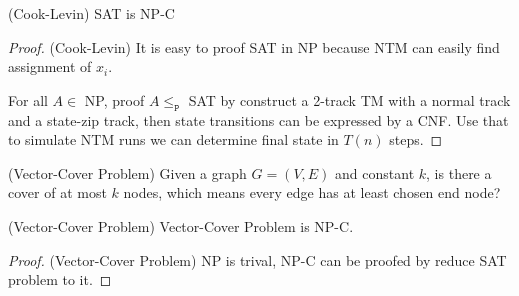     \begin{theorem}
        (Cook-Levin) SAT is NP-C
    \end{theorem}
    \begin{proof}
        (Cook-Levin) It is easy to proof SAT in NP because NTM can easily find assignment of $x_{i}$.

        For all $A\in$ NP, proof  $A\le_{\texttt{P}}$ SAT by construct a 2-track TM with a normal track and a state-zip track, then state transitions can be expressed by a CNF. Use that to simulate NTM runs we can determine final state in $T\left( n \right) $ steps.
    \end{proof}
    \begin{definition}
        (Vector-Cover Problem) Given a graph $G=\left( V,E \right) $ and constant $k$, is there a cover of at most $k$ nodes, which means every edge has at least chosen end node?
    \end{definition}
    \begin{theorem}
        (Vector-Cover Problem) Vector-Cover Problem is NP-C.
    \end{theorem}
    \begin{proof}
        (Vector-Cover Problem) NP is trival, NP-C can be proofed by reduce SAT problem to it.
    \end{proof}


